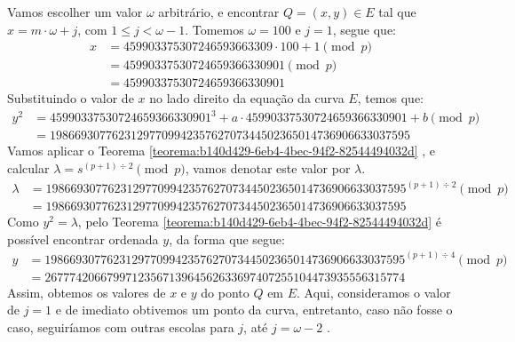 Vamos escolher um valor $\omega$ arbitrário, e encontrar $Q = (x, y) \in E$ tal
que $x = m \cdot \omega + j$, com $1 \leq j < \omega - 1$. Tomemos $\omega =
	100$ e $j = 1$, segue que:
\begin{align}
	x & = 459903375307246593663309 \cdot 100 + 1  \pmod{p} \nonumber                      \\
	  & = 45990337530724659366330901 \pmod{p} \nonumber                                   \\
	  & =  45990337530724659366330901  \label{align:b6ddddbb-d8e5-4c7b-999a-72571ef8d7ee}
\end{align}
Substituindo o valor de $x$ no lado direito da equação da curva $E$, temos que:
\begin{align}
	y^2 & = 45990337530724659366330901^3 + a \cdot 45990337530724659366330901 + b \pmod{p} \nonumber \\
	    & = 1986693077623129770994235762707344502365014736906633037595\nonumber
\end{align}
Vamos aplicar o Teorema \ref{teorema:b140d429-6eb4-4bec-94f2-82544494032d} , e calcular  $\lambda = s^{(p + 1)\div 2 } \pmod{p}$, vamos denotar este valor por $\lambda$.
\begin{align}
	\lambda & = 1986693077623129770994235762707344502365014736906633037595^{(p + 1)\div 2 }\pmod{p}   \nonumber \\
	        & = 1986693077623129770994235762707344502365014736906633037595 \nonumber
\end{align}
Como $y^2 = \lambda$, pelo Teorema \ref{teorema:b140d429-6eb4-4bec-94f2-82544494032d} é possível encontrar ordenada $y$, da forma que segue:
\begin{align}
	y & = 1986693077623129770994235762707344502365014736906633037595^{(p + 1)\div 4}\pmod{p}  \nonumber                 \\
	  & = 2677742066799712356713964562633697407255104473935556315774 \label{align:c8f4319a-4735-437f-9960-27af47b584e3}
\end{align}
Assim,  obtemos os valores de $x$ e $y$ do ponto $Q$ em $E$. Aqui, consideramos o valor de $j = 1$ e de imediato obtivemos um ponto da curva, entretanto, caso não fosse o caso, seguiríamos com outras escolas para $j$, até $j = \omega - 2$ .

